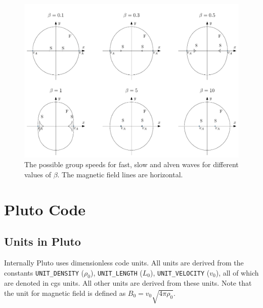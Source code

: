 \documentclass[a4paper]{article}
\begin{document}
\begin{figure}[h]
	\centering
	\includegraphics[width =\textwidth]{figures/groupspeed_beta.pdf}
	\caption{The possible group speeds for fast, slow and alven waves for different values of $\beta$. The magnetic field lines are horizontal.}
	\label{fig:groupspeed_beta}
\end{figure}
\section{Pluto Code} \label{sec:pluto_code}


\subsection{Units in Pluto} \label{sec:units_in_pluto}

Internally Pluto uses dimensionless code units. All units are derived from the constants \texttt{UNIT\_DENSITY} ($\rho_0$), \texttt{UNIT\_LENGTH} ($L_0$), \texttt{UNIT\_VELOCITY} ($v_0$), all of which are denoted in cgs units. All other units are derived from these units.  
Note that the unit for magnetic field is defined as $B_0 = v_0\sqrt{4\pi \rho_0} $.
\end{document}
